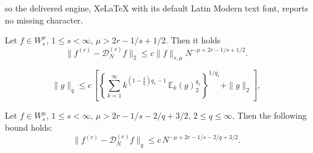 \documentclass[10pt,a4paper]{amsart}
\begin{document}
so the delivered engine, XeLaTeX with its default Latin Modern text font, reports no missing character.
\begin{lemma}\label{lemma_BoundErrHC}
	Let $f\in W^\mu_{s}$, $1\leq s< \infty$, $\mu>2r-1/s+1/2$. Then it holds
	$$
	\|f^{(r)}-\mathcal{D}_N^{(r)} f\|_2 \leq c\|f\|_{s,\mu} N^{-\mu+2r-1/s+1/2}.
	$$
\end{lemma}

\begin{equation}  \label{g}
\|g\|_{q} \le c\,
\left[ \left\{\sum_{k=1}^\infty  k^{(1-\frac{2}{q}) q_1-1}\,\mathbb{E}_k(g)_{2}^{q_1} \right\}^{1/q_1} +
\|g\|_{2} \right] ,
\end{equation}

\begin{lemma}\label{lemma_Bound1_L_q}
Let $f\in W^\mu_{s}$, $1\leq s< \infty$, $\mu>2r-1/s-2/q+3/2$, $2\leq q\le \infty$.
Then the following bound holds:
$$
\|f^{(r)}-\mathcal{D}_N^{(r)} f\|_{q} \leq c\,
N^{-\mu+2r-1/s-2/q+3/2} .
$$
\end{lemma}
\end{document}
